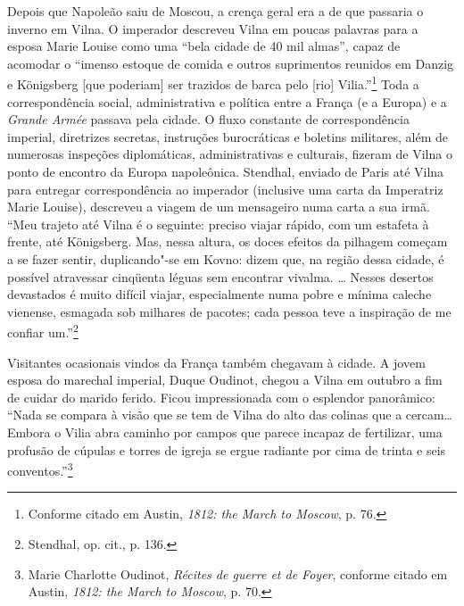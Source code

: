 Depois que Napoleão saiu de Moscou, a crença geral era a de que passaria
o inverno em Vilna. O imperador descreveu Vilna em poucas palavras para
a esposa Marie Louise como uma ``bela cidade de 40 mil almas'', capaz de
acomodar o ``imenso estoque de comida e outros suprimentos reunidos em
Danzig e Königsberg {[}que poderiam{]} ser trazidos de barca pelo
{[}rio{]} Vilia.''\footnote{Conforme citado em Austin, \emph{1812: the
  March to Moscow}, p. 76.} Toda a correspondência social,
administrativa e política entre a França (e a Europa) e a \emph{Grande
Armée} passava pela cidade. O fluxo constante de correspondência
imperial, diretrizes secretas, instruções burocráticas e boletins
militares, além de numerosas inspeções diplomáticas, administrativas e
culturais, fizeram de Vilna o ponto de encontro da Europa napoleônica.
Stendhal, enviado de Paris até Vilna para entregar correspondência ao
imperador (inclusive uma carta da Imperatriz Marie Louise), descreveu a
viagem de um mensageiro numa carta a sua irmã. ``Meu trajeto até Vilna é
o seguinte: preciso viajar rápido, com um estafeta à frente, até
Königsberg. Mas, nessa altura, os doces efeitos da pilhagem começam a se
fazer sentir, duplicando"-se em Kovno: dizem que, na região dessa cidade,
é possível atravessar cinqüenta léguas sem encontrar vivalma. \ldots{}
Nesses desertos devastados é muito difícil viajar, especialmente numa
pobre e mínima caleche vienense, esmagada sob milhares de pacotes; cada
pessoa teve a inspiração de me confiar um.''\footnote{Stendhal, op.
  cit., p. 136.}

Visitantes ocasionais vindos da França também chegavam à cidade. A jovem
esposa do marechal imperial, Duque Oudinot, chegou a Vilna em outubro a
fim de cuidar do marido ferido. Ficou impressionada com o esplendor
panorâmico: ``Nada se compara à visão que se tem de Vilna do alto das
colinas que a cercam\ldots{} Embora o Vilia abra caminho por campos que
parece incapaz de fertilizar, uma profusão de cúpulas e torres de igreja
se ergue radiante por cima de trinta e seis conventos.''\footnote{Marie
  Charlotte Oudinot, \emph{Récites de guerre et de Foyer}, conforme
  citado em Austin, \emph{1812: the March to Moscow}, p. 70.}

